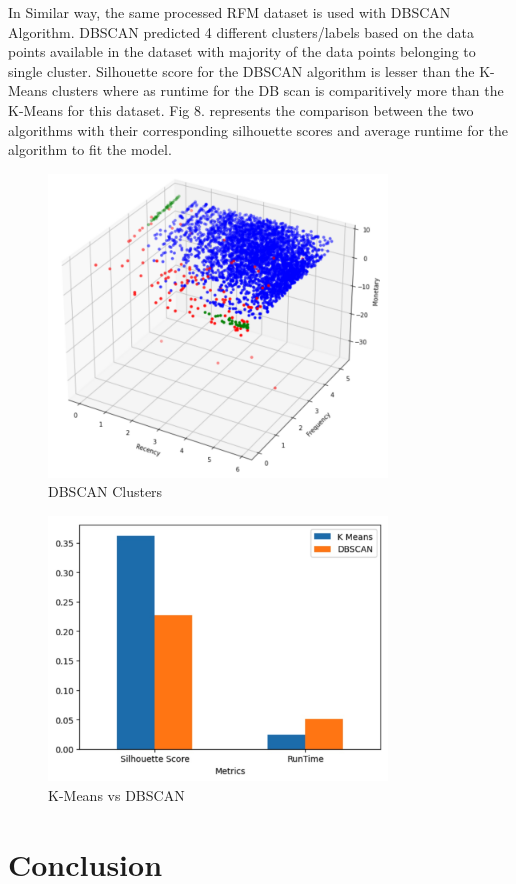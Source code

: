 \documentclass[conference]{IEEEtran}
\begin{document}
 In Similar way, the same processed RFM dataset is used with DBSCAN Algorithm. DBSCAN predicted 4 different clusters/labels based on the data points available in the dataset with majority of the data points belonging to single cluster. Silhouette score for the DBSCAN algorithm is lesser than the K-Means clusters where as runtime for the DB scan is comparitively more than the K-Means for this dataset. Fig 8. represents the comparison between the two algorithms with their corresponding silhouette scores and average runtime for the algorithm to fit the model.
 
   \begin{figure}[h]
\centering
 \includegraphics[width=9cm]{db}
 \caption{DBSCAN Clusters}
 \end{figure}
 
   \begin{figure}[h]
\centering
 \includegraphics[width=9cm]{results}
 \caption{K-Means vs DBSCAN}
 \end{figure}
 

\section{Conclusion}
\end{document}
